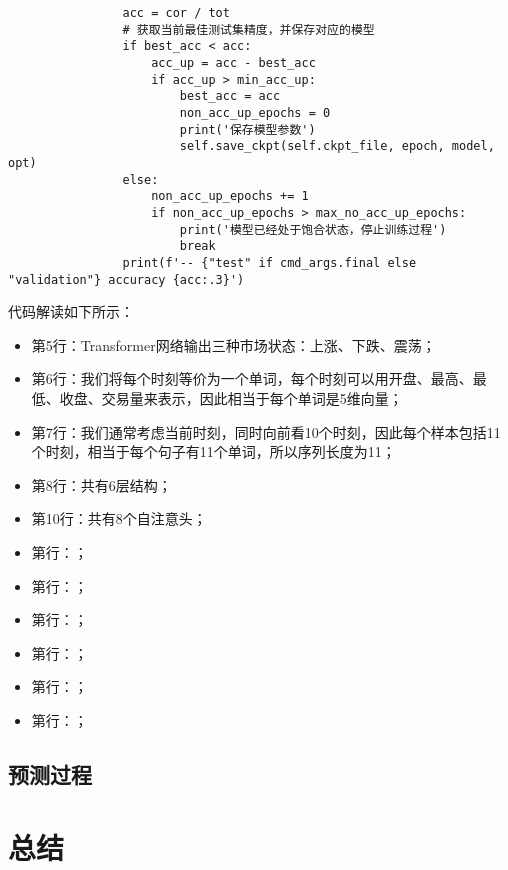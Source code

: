 \begin{lstlisting}
                acc = cor / tot
                # 获取当前最佳测试集精度，并保存对应的模型
                if best_acc < acc:
                    acc_up = acc - best_acc
                    if acc_up > min_acc_up:
                        best_acc = acc
                        non_acc_up_epochs = 0
                        print('保存模型参数')
                        self.save_ckpt(self.ckpt_file, epoch, model, opt)
                else:
                    non_acc_up_epochs += 1
                    if non_acc_up_epochs > max_no_acc_up_epochs:
                        print('模型已经处于饱合状态，停止训练过程')
                        break
                print(f'-- {"test" if cmd_args.final else "validation"} accuracy {acc:.3}')
\end{lstlisting}
代码解读如下所示：
\begin{itemize}
    \item 第5行：Transformer网络输出三种市场状态：上涨、下跌、震荡；
    \item 第6行：我们将每个时刻等价为一个单词，每个时刻可以用开盘、最高、最低、收盘、交易量来表示，因此相当于每个单词是5维向量；
    \item 第7行：我们通常考虑当前时刻，同时向前看10个时刻，因此每个样本包括11个时刻，相当于每个句子有11个单词，所以序列长度为11；
    \item 第8行：共有6层结构；
    \item 第10行：共有8个自注意头；
    \item 第行：；
    \item 第行：；
    \item 第行：；
    \item 第行：；
    \item 第行：；
    \item 第行：；
\end{itemize}

\subsection{预测过程}

\section{总结}